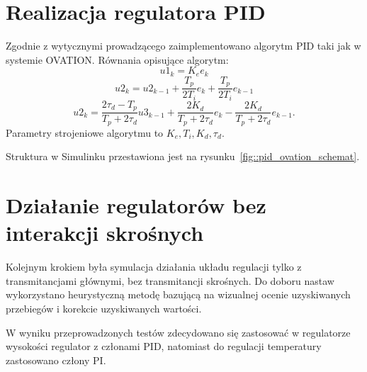 \documentclass{article}
\begin{document}
\section{Realizacja regulatora PID}
Zgodnie z wytycznymi prowadzącego zaimplementowano algorytm PID taki jak w systemie OVATION. Równania opisujące algorytm:
\[
u1_k = K_e e_k
\]
\[
u2_k=u2_{k-1} + \frac{T_p}{2T_i}e_k + \frac{T_p}{2T_i}e_{k-1}
\]
\[
u2_k = \frac{2\tau_d - T_p}{T_p+2\tau_d}u3_{k-1} + \frac{2K_d}{T_p+2\tau_d}e_k -  \frac{2K_d}{T_p+2\tau_d}e_{k-1}.
\]
Parametry strojeniowe algorytmu to $K_e, T_i, K_d, \tau_d$.

Struktura w Simulinku przestawiona jest na rysunku~\ref{fig::pid_ovation_schemat}.

\section{Działanie regulatorów bez interakcji skrośnych}
Kolejnym krokiem była symulacja działania układu regulacji tylko z transmitancjami głównymi, bez transmitancji skrośnych. Do doboru nastaw wykorzystano heurystyczną metodę bazującą na wizualnej ocenie uzyskiwanych przebiegów i korekcie uzyskiwanych wartości.

W wyniku przeprowadzonych testów zdecydowano się zastosować w regulatorze wysokości regulator z członami PID, natomiast do regulacji temperatury zastosowano człony PI.
\end{document}
